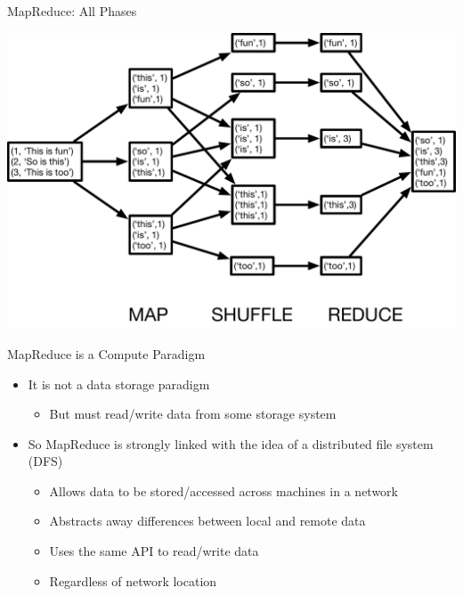 \documentclass[aspectratio=169]{beamer}
\begin{document}
\begin{frame}{MapReduce: All Phases}

\begin{center}
    	{\includegraphics[width=.8\textwidth]{./lectBigData/MRphases.pdf}} 
\end{center}

	
\end{frame}
\begin{frame}{MapReduce is a Compute Paradigm}

\begin{itemize}
\item It is not a data storage paradigm
        \begin{itemize}
	\item But must read/write data from some storage
system
        \end{itemize}
\item So MapReduce is strongly linked with the idea of a distributed file system (DFS)
        \begin{itemize}
        \item Allows data to be stored/accessed
across machines in a network
        \item Abstracts away differences between local and remote data
        \item Uses the same API to read/write data
        \item Regardless of network location
        \end{itemize}
\end{itemize}
\end{frame}
\end{document}
